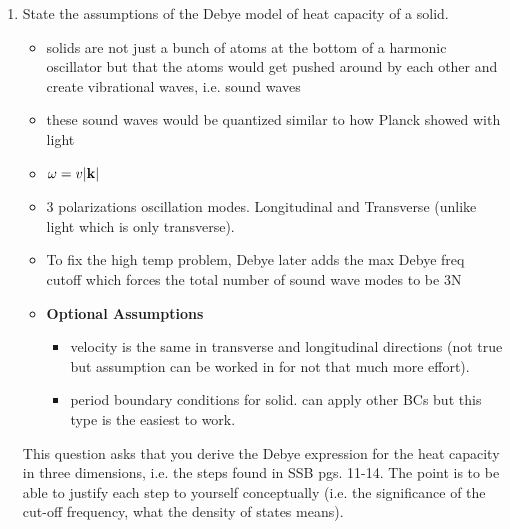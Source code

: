 \begin{enumerate}[label=(\alph*)]
    \item State the assumptions of the Debye model of heat capacity of a solid.

    \divider

    \begin{itemize}
        \item solids are not just a bunch of atoms at the bottom of a harmonic oscillator but that the atoms would get pushed around by each other and create vibrational waves, i.e. sound waves

        \item these sound waves would be quantized similar to how Planck showed with light

        \item $\omega = v \abs{\vb{k}}$
        \item 3 polarizations oscillation modes. Longitudinal and Transverse (unlike light which is only transverse).
        \item To fix the high temp problem, Debye later adds the max Debye freq cutoff which forces the total number of sound wave modes  to be 3N 

        \item \textbf{Optional Assumptions}
        \begin{itemize}
            \item velocity is the same in transverse and longitudinal directions (not true but assumption can be worked in for not that much more effort).
            \item period boundary conditions for solid. can apply other BCs but this type is the easiest to work.
        \end{itemize}
        
    \end{itemize}

    

    This question asks that you derive the Debye expression for the heat capacity in three dimensions, i.e. the steps found in SSB pgs. 11-14. The point is to be able to justify each step to yourself conceptually (i.e. the significance of the cut-off frequency, what the density of states means).
    


\end{enumerate}

